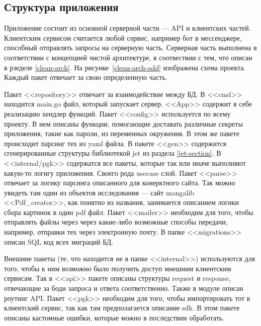 \subsection{Структура приложения}
Приложение состоит из основной серверной части --- API и клиентских частей. 
Клиентским сервисом считается любой сервис, например бот в мессенджере, способный отправлять запросы на серверную часть.
Серверная часть выполнена в соответствии с концепцией чистой архитектуре, в соотвествии с тем, что описан в рзеделе \ref{clean-arch}.
На рисунке~\ref{clean-arch-add} изображена схема проекта.
Каждый пакет отвечает за свою определенную часть.

Пакет <<repository>> отвечает за взаимодействие между БД. В <<cmd>> находится main.go файл, который запускает сервер.
<<App>> содержит в себе реализацию хендлер функций. Пакет <<config>> используется по всему проекту. 
В нем описаны функции, помогающие доставать различные секреты приложения, такие как пароли, из переменных окружения.
В этом же пакете происходит парсинг тех из yaml файла.
В пакете <<gen>> содержится сгенерированные структуры библиотекой jet из раздела \ref{jet-section}. 
В <<internal/pgk>> содержатся все пакеты, которые так или иначе выполняют какую-то логигу приложения.
Своего рода usecase слой.
Пакет <<parse>> отвечает за логику парсинга описанного для конерктного сайта. Так можно увидеть там один из объектов исследования --- сайт mangalib
<<Pdf\_creator>>, как понятно из названия, занимается описанием логики сбора картинок в один pdf файл.
Пакет <<mailer>> необходим для того, чтобы отправлять файлы через через какие-либо возможные способы передачи, например, отправки тех через электронную почту.
В папке <<migrations>> описан SQL код всех миграций БД.

Внешние пакеты (те, что находится не в папке <<internal>>) используются для того, чтобы к ним возможно было получить доступ мнешним клиентским сервисам.
Так в <<api>> пакете описаны структуры request и response, отвечающие за боди запроса и ответа соответственно.
Также в модуле описан роутинг API. 
Пакет <<pgk>> необходим для того, чтобы импортировать тот в клиентский сервис, так как там предполагается описание sdk.
В этом пакете описаны кастомные ошибки, которые можно в последствии обработать.